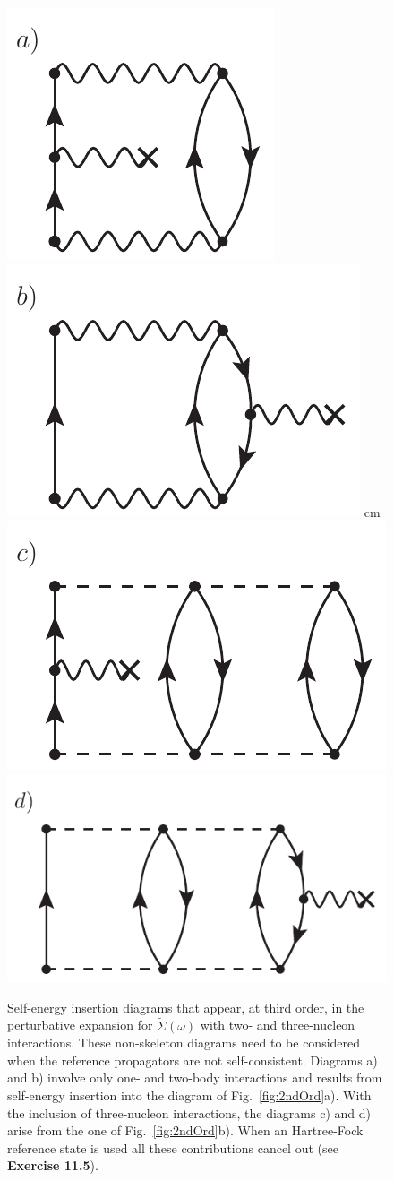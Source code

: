 \begin{figure}[t]
\begin{center}
\includegraphics[height=0.22\textwidth]{Chapter11-figures/fig11_5_a.pdf}   \hspace{0.25\textwidth}
\includegraphics[height=0.22\textwidth]{Chapter11-figures/fig11_5_b.pdf}   \hspace{0.20\textwidth}
 cm
\includegraphics[height=0.21\textwidth]{Chapter11-figures/fig11_5_c.pdf}   \hspace{0.1\textwidth}
\includegraphics[height=0.21\textwidth]{Chapter11-figures/fig11_5_d.pdf}
\caption{Self-energy insertion diagrams that appear, at third order, in the perturbative expansion for $\widetilde\Sigma(\omega)$ with two- and three-nucleon interactions. These non-skeleton diagrams need to be considered  when the reference propagators are not self-consistent.  Diagrams a) and b) involve only one- and two-body interactions and results from self-energy insertion into the diagram of Fig.~\ref{fig:2ndOrd}a).  With the inclusion of three-nucleon interactions, the diagrams c) and d) arise from the one of Fig.~\ref{fig:2ndOrd}b).  When an Hartree-Fock reference state is used all these contributions cancel out (see {\bf Exercise 11.5}). }
\label{fig:SEins_3ndOrd}
\end{center}
\end{figure}

